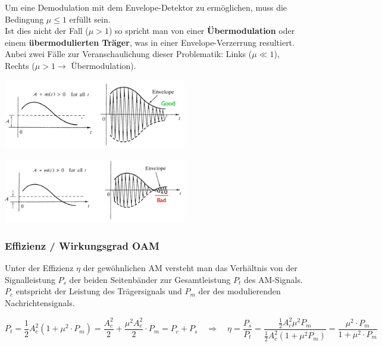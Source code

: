 Um eine Demodulation mit dem Envelope-Detektor zu ermöglichen, muss die Bedingung 
\textbf{$\mu \leq 1$} erfüllt sein. \\
Ist dies nicht der Fall (\textbf{$\mu > 1$}) so spricht man von einer \textbf{Übermodulation} oder
einem  \textbf{übermodulierten Träger}, was in einer Envelope-Verzerrung resultiert. \\
Anbei zwei Fälle zur Veranschaulichung dieser Problematik: Links ($\mu \ll 1$), Rechts ($\mu > 1
\rightarrow $ Übermodulation).

\begin{minipage}[t][2.3cm][c]{9.5cm}
	\begin{center}
      \includegraphics[width=8cm]{bilder/am_oam_enveloppeGood.png}
	\end{center}
\end{minipage}
\begin{minipage}[t][2.3cm][c]{9.5cm}
    \begin{center}
    	\includegraphics[width=8cm]{bilder/am_oam_enveloppeBad.png}
	\end{center}
\end{minipage}

\subsubsection{Effizienz / Wirkungsgrad OAM }
Unter der Effizienz $ \eta $ der gewöhnlichen AM versteht man das Verhältnis von der Signalleistung
$P_s$ der beiden Seitenbänder zur Gesamtleistung $P_t$ des AM-Signals. $P_c$ entspricht der Leistung des Trägersignals und $P_m$ der des modulierenden Nachrichtensignals.

\[ P_t = \frac{1}{2}A_c^2(1 + \mu^2 \cdot P_m) =  \frac{A_c^2}{2} + \frac{\mu^2 A_c^2}{2}\cdot P_m = P_c + P_s  \quad 
\Longrightarrow 
\quad \eta = \frac{P_s}{P_t} = \frac{\frac{1}{2}A_c^2 \mu^2 P_m}{\frac{1}{2}A_c^2(1 + \mu^2 P_m)} = \frac{\mu^2 \cdot P_m}{1 + \mu^2 \cdot P_m}\]

